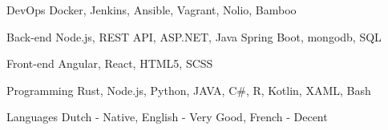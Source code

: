 

\begin{cvskills}

  \cvskill
    {DevOps} %
    {Docker, Jenkins, Ansible, Vagrant, Nolio, Bamboo} %

  \cvskill
    {Back-end} %
    {Node.js, REST API, ASP.NET, Java Spring Boot, mongodb, SQL} %

  \cvskill
    {Front-end} %
    {Angular, React, HTML5, SCSS} %

  \cvskill
    {Programming} %
    {Rust, Node.js, Python, JAVA, C\#, R, Kotlin, XAML, Bash} %

  \cvskill
    {Languages} %
	{Dutch - Native, English - Very Good, French - Decent} %

\end{cvskills}
